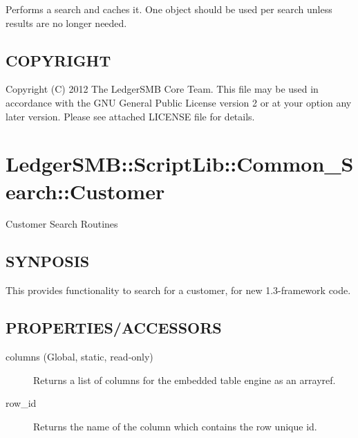 \begin{description}
\begin{description}
Performs a search and caches it.  One object should be used per search unless
results are no longer needed.

\end{description}
\subsection*{COPYRIGHT\label{LedgerSMB::ScriptLib::Common_Search::Part_COPYRIGHT}}


Copyright (C) 2012 The LedgerSMB Core Team.  This file may be used in 
accordance with the GNU General Public License version 2 or at your option any
later version.  Please see attached LICENSE file for details.

\section{LedgerSMB::ScriptLib::Common\_Search::Customer\label{LedgerSMB::ScriptLib::Common_Search::Customer}}


Customer Search Routines

\subsection*{SYNPOSIS\label{LedgerSMB::ScriptLib::Common_Search::Customer_SYNPOSIS}}


This provides functionality to search for a customer,
for new 1.3-framework code.

\subsection*{PROPERTIES/ACCESSORS\label{LedgerSMB::ScriptLib::Common_Search::Customer_PROPERTIES_ACCESSORS}}
\begin{description}

\item[{columns (Global, static, read-only)}] \mbox{}

Returns a list of columns for the embedded table engine as an arrayref.


\item[{row\_id}] \mbox{}

Returns the name of the column which contains the row unique id.



\end{description}
\end{description}
